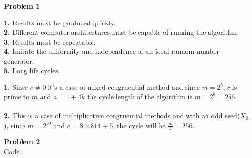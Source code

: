 \documentclass{article}
\newenvironment{problem}[2][Problem]
    { \begin{mdframed}[backgroundcolor=gray!20] \textbf{#1 #2} \\}
    {  \end{mdframed}}
\begin{document}
    \begin{problem}{1}
    	\begin{section}{}
    	\noindent
    	\textbf{1. } Results must be produced quickly. \\
    	\textbf{2. } Different computer architectures must be capable of running the algorithm. \\
    	\textbf{3. } Results must be repeatable. \\
    	\textbf{4. } Imitate the uniformity and independence of an ideal random number generator. \\
    	\textbf{5. } Long life cycles. \\
    	\end{section}
    	\begin{section}{}
    		\noindent
    		\textbf{1. } Since $c\neq0$ it's a case of mixed congruential
    		method and since $m = 2^b$, $c$ is prime to $m$ and $a=1+4k$
    		the cycle length of the algorithm is $m=2^b=256$.
    		\\ \\ \textbf{2. } This is a case of multiplicative congruential methods and with an odd seed($X_0$), since $m=2^{10}$ and 
    		$a=8\times814 + 5$, the cycle will be $\frac{m}{4}=256$.
    	\end{section}
    
    \end{problem}
	\begin{problem}{2}
		Code.
	\end{problem}
    
\end{document}
